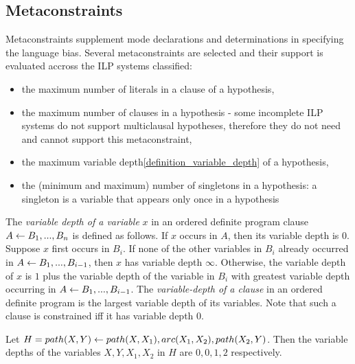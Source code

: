 \subsection{Metaconstraints}\label{classification_metaconstraints}
Metaconstraints supplement mode declarations and determinations in specifying the language bias. Several metaconstraints are selected and their support is evaluated accross the ILP systems classified:

\begin{itemize}
\item the maximum number of literals in a clause of a hypothesis,
\item the maximum number of clauses in a hypothesis - some incomplete ILP systems do not support multiclausal hypotheses, therefore they do not need and cannot support this metaconstraint,
\item the maximum variable depth\ref{definition_variable_depth} of a hypothesis,
\item the (minimum and maximum) number of singletons in a hypothesis:
a singleton is a variable that appears only once in a hypothesis\cite{santos2008toplogWebsite}
\end{itemize}

\begin{defn}\label{definition_variable_depth}\cite{nienhuys1997foundations}
The \emph{variable depth of a variable} $x$ in an ordered definite program clause
$A \leftarrow  B_1, . . . , B_n$ is defined as follows. If $x$ occurs in $A$, then its variable depth is $0$. Suppose $x$ first occurs in $B_i$.
If none of the other variables
in $B_i$ already occurred in $A \leftarrow B_1,... ,B_{i-1}$,
then $x$ has variable depth $\infty$.
Otherwise, the variable depth of $x$ is $1$ plus the variable depth of the variable in $B_i$ with greatest variable depth occurring in
$A \leftarrow B_1,... ,B_{i-1}$.
The \emph{variable-depth of a clause} in an ordered definite program
is the largest variable depth of its variables. Note that such a
clause is constrained iff it has variable depth $0$.
\end{defn}

\begin{exmp}
Let $H=path(X,Y) \leftarrow path(X,X_1), arc(X_1,X_2), path(X_2,Y)$.
Then the variable depths of the variables $X,Y,X_1,X_2$ in $H$ are
$0,0,1,2$ respectively.
\end{exmp}

